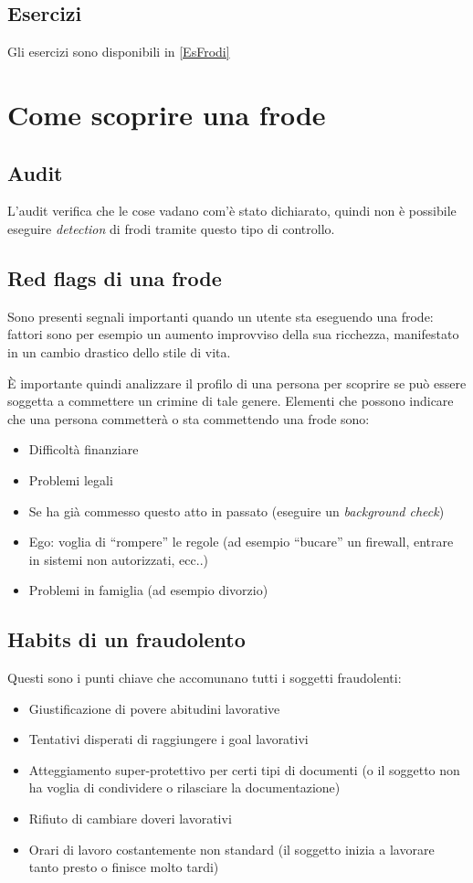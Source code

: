 \subsection{Esercizi}

Gli esercizi sono disponibili in \ref{EsFrodi}

\section{Come scoprire una frode}

\subsection{Audit}

L'audit verifica che le cose vadano com'è stato dichiarato, quindi non è
possibile eseguire \textit{detection} di frodi tramite questo tipo di controllo.

\subsection{Red flags di una frode}
Sono presenti segnali importanti quando un utente sta eseguendo una frode: 
fattori sono per esempio un aumento improvviso della sua ricchezza, manifestato
in un cambio drastico dello stile di vita.

È importante quindi analizzare il profilo di una persona per scoprire se può
essere soggetta a commettere un crimine di tale genere. Elementi che possono 
indicare che una persona commetterà o sta commettendo una frode sono:
\begin{itemize}
  \item Difficoltà finanziare
  \item Problemi legali
  \item Se ha già commesso questo atto in passato (eseguire un
  \textit{background check})
  \item Ego: voglia di ``rompere'' le regole (ad esempio ``bucare'' un
  firewall, entrare in sistemi non autorizzati, ecc..)
  \item Problemi in famiglia (ad esempio divorzio)
\end{itemize}

\subsection{Habits di un fraudolento}

Questi sono i punti chiave che accomunano tutti i soggetti fraudolenti:
\begin{itemize}
  \item Giustificazione di povere abitudini lavorative
  \item Tentativi disperati di raggiungere i goal lavorativi
  \item Atteggiamento super-protettivo per certi tipi di documenti (o il 
  soggetto non ha voglia di condividere o rilasciare la documentazione)
  \item Rifiuto di cambiare doveri lavorativi
  \item Orari di lavoro costantemente non standard (il soggetto inizia a 
  lavorare tanto presto o finisce molto tardi)
\end{itemize}

